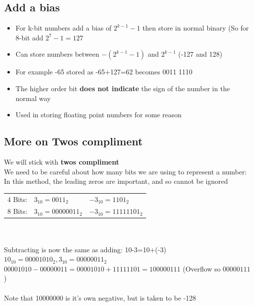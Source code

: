 \documentclass{article}[18pt]
\begin{document}
\subsection{Add a bias}
\begin{itemize}
\item For k-bit numbers add a bias of $2^{k-1}-1$ then store in normal binary (So for 8-bit add $2^7-1=127$
\item Can store numbers between $-(2^{k-1}-1)$ and $2^{k-1}$ (-127 and 128)
\item For example -65 stored as -65+127=62 becomes 0011 1110
\item The higher order bit \textbf{does not indicate} the sign of the number in the normal way
\item Used in storing floating point numbers for some reason
\end{itemize}
\subsection{More on Twos compliment}
We will stick with \textbf{twos compliment}\\
We need to be careful about how many bits we are using to represent a number:\\
In this method, the leading zeros are important, and so cannot be ignored
\\
\begin{tabular}{l l l}
4 Bits:&$3_{10}=0011_2$&$-3_{10}=1101_2$\\
8 Bits:&$3_{10}=0000 0011_2$&$-3_{10}=1111 1101_2$
\end{tabular}\\
\\
Subtracting is now the same as adding: 10-3=10+(-3)\\
$10_{10}=0000 1010_2, 3_10=0000 0011_2$\\
$0000 1010 - 0000 0011=0000 1010 + 1111 1101=1 0000 0111$ (Overflow so $0000 0111$)\\
\\
Note that 10000000 is it's own negative, but is taken to be -128
\end{document}
